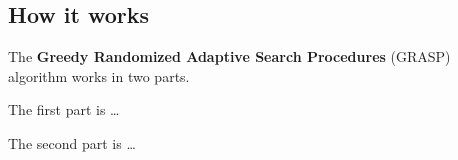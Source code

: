 
\subsection{How it works}

The \textbf{Greedy Randomized Adaptive Search Procedures} (GRASP) algorithm works in two parts.
\bigskip

The first part is \dots
\bigskip

The second part is \dots
\bigskip
